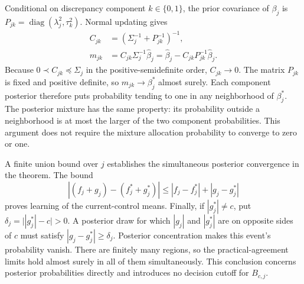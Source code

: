 Conditional on discrepancy component $k\in\{0,1\}$, the prior covariance of $\beta_j$ is $P_{jk}=\operatorname{diag}(\lambda_j^2,\tau_k^2)$. Normal updating gives
\begin{equation}\label{eq:regional_posterior}
\begin{aligned}
C_{jk}&=(\Sigma_j^{-1}+P_{jk}^{-1})^{-1},\\
m_{jk}&=C_{jk}\Sigma_j^{-1}\widehat\beta_j
=\widehat\beta_j-C_{jk}P_{jk}^{-1}\widehat\beta_j.
\end{aligned}
\end{equation}
Because $0\prec C_{jk}\preceq\Sigma_j$ in the positive-semidefinite order, $C_{jk}\to0$. The matrix $P_{jk}$ is fixed and positive definite, so $m_{jk}\to\beta_j^*$ almost surely. Each component posterior therefore puts probability tending to one in any neighborhood of $\beta_j^*$. The posterior mixture has the same property: its probability outside a neighborhood is at most the larger of the two component probabilities. This argument does not require the mixture allocation probability to converge to zero or one.

A finite union bound over $j$ establishes the simultaneous posterior convergence in the theorem. The bound
\[
|(f_j+g_j)-(f_j^*+g_j^*)|\leq|f_j-f_j^*|+|g_j-g_j^*|
\]
proves learning of the current-control means. Finally, if $|g_j^*|\ne c$, put $\delta_j=\bigl||g_j^*|-c\bigr|>0$. A posterior draw for which $|g_j|$ and $|g_j^*|$ are on opposite sides of $c$ must satisfy $|g_j-g_j^*|\geq\delta_j$. Posterior concentration makes this event's probability vanish. There are finitely many regions, so the practical-agreement limits hold almost surely in all of them simultaneously. This conclusion concerns posterior probabilities directly and introduces no decision cutoff for $B_{c,j}$.

